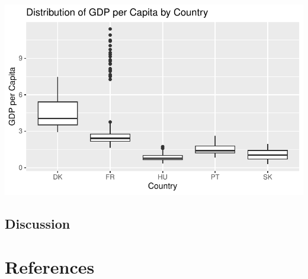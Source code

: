 \documentclass[
  a4paper,
  DIV=11,
  numbers=noendperiod]{scrartcl}
\begin{document}
\includegraphics{assignment_1_files/figure-pdf/unnamed-chunk-25-1.pdf}

\hypertarget{discussion}{%
\subsection{Discussion}\label{discussion}}

\hypertarget{references}{%
\section*{References}\label{references}}
\end{document}
